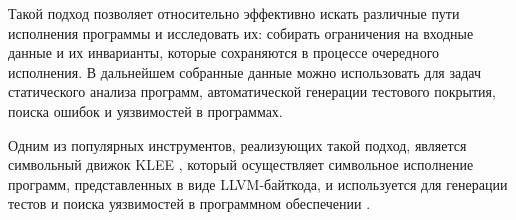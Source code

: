 Такой подход позволяет относительно эффективно искать различные пути исполнения программы и исследовать их: собирать ограничения на входные данные и их инварианты, которые сохраняются в процессе очередного исполнения. В дальнейшем собранные данные можно использовать для задач статического анализа программ, автоматической генерации тестового покрытия, поиска ошибок и уязвимостей в программах.

Одним из популярных инструментов, реализующих такой подход, является символьный движок KLEE \cite{klee-website}, который осуществляет символьное исполнение программ, представленных в виде LLVM-байткода, и используется для генерации тестов и поиска уязвимостей в программном обеспечении \cite{klee-paper}.